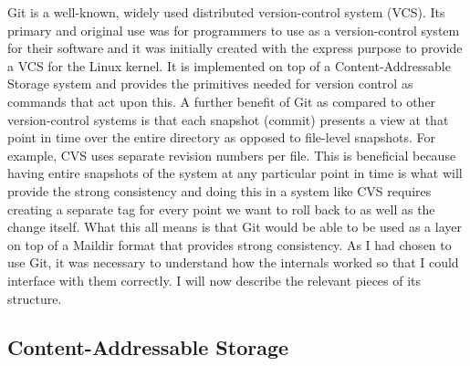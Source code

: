 Git\cite{code_git} is a well-known, widely used distributed version-control system (VCS). Its primary and original use was for programmers to use as a version-control system for their software and it was initially created with the express purpose to provide a VCS for the Linux kernel\cite{chacon2014git}. It is implemented on top of a Content-Addressable Storage system and provides the primitives needed for version control as commands that act upon this. A further benefit of Git as compared to other version-control systems is that each snapshot (commit) presents a view at that point in time over the entire directory as opposed to file-level snapshots. For example, CVS\cite{code_cvs} uses separate revision numbers per file. This is beneficial because having entire snapshots of the system at any particular point in time is what will provide the strong consistency and doing this in a system like CVS requires creating a separate tag for every point we want to roll back to as well as the change itself. What this all means is that Git would be able to be used as a layer on top of a Maildir format that provides strong consistency. As I had chosen to use Git, it was necessary to understand how the internals worked so that I could interface with them correctly. I will now describe the relevant pieces of its structure.

\subsection{Content-Addressable Storage}

